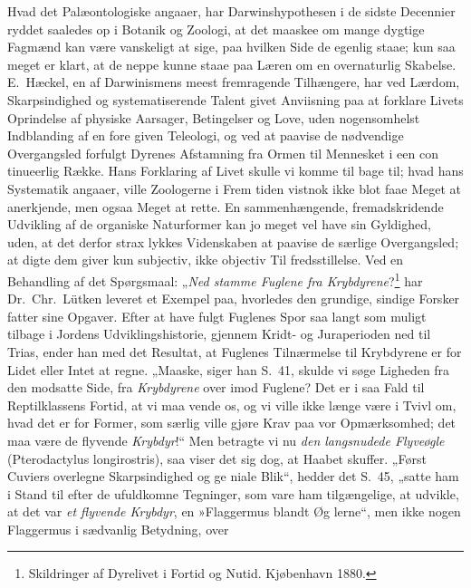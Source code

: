 \documentclass[12pt,a4paper]{article}
\newcommand{\opage}[1]{\marginnote{\footnotesize\textit{[#1]}}}
\begin{document}
Hvad det Palæontologiske angaaer, har Darwinshypothesen
i de sidste Decennier ryddet saaledes op i Botanik og Zoologi, at
det maaskee om mange dygtige Fagmænd kan være vanskeligt at
sige, paa hvilken Side de egenlig staae; kun saa meget er klart,
at de neppe kunne staae paa Læren om en overnaturlig Skabelse.
E.\ Hæckel, en af Darwinismens meest fremragende Tilhængere,
har ved Lærdom, Skarpsindighed og systematiserende Talent givet
Anviisning paa at forklare Livets Oprindelse af physiske Aarsager,
Betingelser og Love, uden nogensomhelst Indblanding af en fore\-%
\opage{38}given Teleologi, og ved at paavise de nødvendige Overgangsled
forfulgt Dyrenes Afstamning fra Ormen til Mennesket i een con\-%
tinueerlig Række. Hans Forklaring af Livet skulle vi komme til\-%
bage til; hvad hans Systematik angaaer, ville Zoologerne i Frem\-%
tiden vistnok ikke blot faae Meget at anerkjende, men ogsaa
Meget at rette. En sammenhængende, fremadskridende Udvikling
af de organiske Naturformer kan jo meget vel have sin Gyldighed,
uden, at det derfor strax lykkes Videnskaben at paavise de særlige
Overgangsled; at digte dem giver kun subjectiv, ikke objectiv Til\-%
fredsstillelse. Ved en Behandling af det Spørgsmaal: „\emph{Ned\-%
stamme Fuglene fra Krybdyrene}?\footnote{Skildringer af Dyrelivet i Fortid og Nutid. Kjøbenhavn 1880.} %
har Dr.\ Chr.\ Lütken
leveret et Exempel paa, hvorledes den grundige, sindige Forsker
fatter sine Opgaver. Efter at have fulgt Fuglenes Spor saa langt
som muligt tilbage i Jordens Udviklingshistorie, gjennem Kridt-
og Juraperioden ned til Trias, ender han med det Resultat, at
Fuglenes Tilnærmelse til Krybdyrene er for Lidet eller Intet at
regne. „Maaske, siger han S.\ 41, skulde vi søge Ligheden fra
den modsatte Side, fra \emph{Krybdyrene} over imod Fuglene? Det
er i saa Fald til Reptilklassens Fortid, at vi maa vende os, og vi
ville ikke længe være i Tvivl om, hvad det er for Former, som
særlig ville gjøre Krav paa vor Opmærksomhed; det maa være
de flyvende \emph{Krybdyr}!“ Men betragte vi nu \emph{den langsnudede
Flyveøgle} (Pterodactylus longirostris), saa viser det sig dog, at
Haabet skuffer. „Først Cuviers overlegne Skarpsindighed og ge\-%
niale Blik“, hedder det S.\ 45, „satte ham i Stand til efter de
ufuldkomne Tegninger, som vare ham tilgængelige, at udvikle, at
det var \emph{et flyvende Krybdyr}, en »Flaggermus blandt Øg\-%
lerne“, men ikke nogen Flaggermus i sædvanlig Betydning, over\-%
\end{document}
